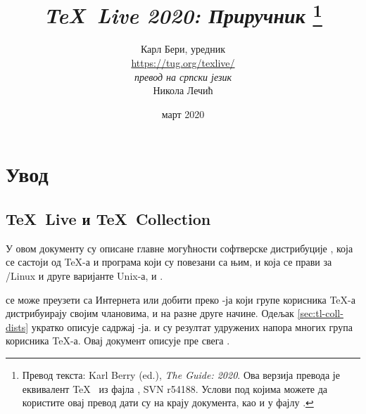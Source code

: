 \documentclass{article}
\begin{document}
\setlength{\droptitle}{-3em}

\title{%
  \huge \textit{\TeX\ Live 2020: Приручник}%
    \protect\footnote{\textserbian{Превод текста: \textenglish{Karl Berry
    (ed.), \emph{The \TL{} Guide: \TL{} 2020}}. Ова верзија превода је
    еквивалент \TeX\  из фајла
    \hbox{}, SVN r54188. Услови под којима
    можете да користите овај превод дати су на крају документа, као
    и у фајлу \hbox{}.}}%
}

\author{%
  Карл Бери, уредник\\[.8mm]
  \url{https://tug.org/texlive/}\\[5.0mm]
  \small{\textit{превод на српски језик}}\\[.9mm]
  \small{Никола Лечић}\\
  \scriptsize{\protect{}}
}

\date{март 2020}

\maketitle
\tableofcontents

\vfill
\pagebreak

\section{Увод}
\label{sec:intro}

\subsection{\protect\TeX\protect\ Live и \protect\TeX\protect\ Collection}

У овом документу су описане главне могућности софтверске дистрибуције
\TL{}, која се састоји од \TeX{}-а и програма који су повезани са њим,
и која се прави за \GNU/Linux и друге варијанте Unix-а, \MacOSX и
\Windows{}.

\TL{} се може преузети са Интернета или добити преко \TK{} \DVD-ја
који групе корисника \TeX{}-а дистрибуирају својим члановима, и на
разне друге начине. Одељак \ref{sec:tl-coll-dists} укратко описује
садржај \DVD-ја. \TL{} и \TK{} су резултат удружених напора многих
група корисника \TeX{}-а. Овај документ описује пре свега
 \TL{}.
\end{document}
